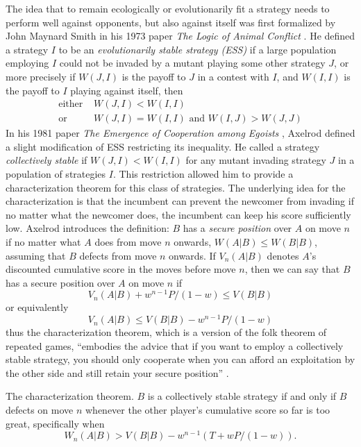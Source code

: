 The idea that to remain ecologically or evolutionarily fit a strategy needs to perform well against opponents, but also against itself was first formalized by John Maynard Smith in his 1973 paper \textit{The Logic of Animal Conflict} \cite{MaynardSmith1973}. He defined a strategy $I$ to be an \textit{evolutionarily stable strategy (ESS)} if a large population employing $I$ could not be invaded by a mutant playing some other strategy $J$, or more precisely if $W(J, I)$ is the payoff to $J$ in a contest with $I$, and $W(I, I)$ is the payoff to $I$ playing against itself, then
\begin{align*}
\textrm{either } & W(J, I) < W(I, I) \\
\textrm{or } & W(J, I) = W(I, I) \textrm{ and } W(I, J) > W(J, J)
\end{align*}
In his 1981 paper \textit{The Emergence of Cooperation among Egoists} \cite{RobertAxelrod_1981}, Axelrod defined a slight modification of ESS restricting its inequality. He called a strategy \textit{collectively stable} if $W(J, I) < W(I, I)$ for any mutant invading strategy $J$ in a population of strategies $I$. This restriction allowed him to provide a characterization theorem for this class of strategies. The underlying idea for the characterization is that the incumbent can prevent the newcomer from invading if no matter what the newcomer does, the incumbent can keep his score sufficiently low. Axelrod introduces the definition: $B$ has a \textit{secure position} over $A$ on move $n$ if no matter what $A$ does from move $n$ onwards, $W(A|B) \leq W(B|B)$, assuming that $B$ defects from move $n$ onwards. If $V_n(A|B)$ denotes $A$'s discounted cumulative score in the moves before move $n$, then we can say that $B$ has a secure position over $A$ on move $n$ if 
\[
V_n(A | B) + w^{n-1} P/(1-w) \leq V(B | B)
\]
or equivalently
\begin{equation}\label{eq:secpos}
V_n(A | B) \leq  V(B | B) - w^{n-1} P/(1-w) 
\end{equation}
thus the characterization theorem, which is a version of the folk theorem of repeated games, ``embodies the advice that if you want to employ a collectively stable strategy, you should only cooperate when you can afford an exploitation by the other side and still retain your secure position'' \cite[p.313]{RobertAxelrod_1981}.

\begin{theorem}The characterization theorem.
$B$ is a collectively stable strategy if and only if $B$ defects on move $n$ whenever the other player's cumulative score so far is too great, specifically when
\begin{equation}\label{eq:charactthm}
W_n(A|B) > V(B|B) - w^{n-1}(T + wP/(1-w)).
\end{equation}
\end{theorem}

